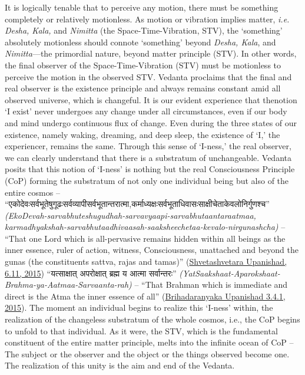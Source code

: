 \documentclass[twoside, 13pt]{article}
\begin{document}
{{It is logically tenable that to perceive any motion, there must be something completely or relatively motionless. As motion or vibration implies matter, \textit{i.e. Desha, Kala,} and \textit{Nimitta} (the Space-Time-Vibration, STV), the ‘something’ absolutely motionless should connote ‘something’ beyond \textit{Desha, Kala}, and \textit{Nimitta}—the primordial nature, beyond matter principle (STV). In other words, the final observer of the Space-Time-Vibration (STV) must be motionless to perceive the motion in the observed STV. Vedanta proclaims that the final and real observer is the existence principle and always remains constant amid all observed universe, which is changeful. It is our evident experience that the\break notion ‘I exist’ never undergoes any change under all circumstances, even if our body and mind undergo continuous flux of change. Even during the three states of our existence, namely waking, dreaming, and deep sleep, the existence of ‘I,’ the experiencer, remains the same. Through this sense of ‘I-ness,’ the real observer, we can clearly understand that there is a substratum of unchangeable. Vedanta posits that this notion of ‘I-ness’ is nothing but the real Consciousness Principle (CoP) forming the substratum of not only one individual being but also of the entire cosmos – \foreignlanguage{hindi}{{\fontsize{9}{11}\selectfont “एकोदेवःसर्वभूतेषुगूढःसर्वव्यापीसर्वभूतान्तरात्मा,\break  कर्माध्यक्षःसर्वभूताधिवासःसाक्षीचेताकेवलोनिर्गुणश्च”}} \textit{(EkoDevah-sarvabhuteshugudhah-sarvavyaapi-sarvabh\-utaantaraatmaa, karmadhyakshah-sarvabhutaadhivaasah-saaksheechetaa-kevalo-nirgun\-ashcha)} – “That one Lord which is all-pervasive remains hidden within all beings as the inner essence, ruler of action, witness, Consciousness, unattached and beyond the gunas (the constituents sattva, rajas and tamas)” (\underline{Shvetashvetara Upanishad, 6.11, 2015}) \foreignlanguage{hindi}{{\fontsize{9}{11}\selectfont“यत्साक्षात् अपरोक्षात् ब्रह्म य आत्मा सर्वान्तरः”}} \textit{(YatSaakshaat-Aparokshaat-Brahma-ya-Aatmaa-Sarvaanta-\break rah)} – “That Brahman which is immediate and direct is the Atma the inner essence of all” (\underline{Brihadaranyaka Upanishad 3.4.1, 2015}). The moment an individual begins to realize this ‘I-ness’ within, the realization of the changeless substratum of the whole cosmos, i.e., the CoP begins to unfold to that individual. As it were, the STV, which is the fundamental constituent of the entire matter principle, melts into the infinite ocean of CoP – The subject or the observer and the object or the things observed become one. The realization of this unity is the aim and end of the Vedanta. 

}}
\end{document}
